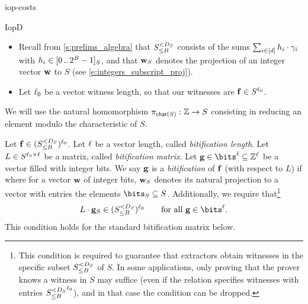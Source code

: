 \begin{lncsappendix}{iop-costs}
\begin{lncsmove}{IopD}
\begin{itemize}[leftmargin=*]
Let $D_S\geq 1$ be a degree bound, let $1,\eta_1,\ldots,\eta_{k_S}$ be a generating set of $S$ (\cref{s:prelims_algebra}), and let $\gamma_1, \gamma_2,\ldots, \gamma_\moduledegree\in S$ be the distinct elements of the form   with $a_1,\ldots,a_{k_S}\geq 0$ and $a_1+\cdots+a_{k_S}< D_S$, i.e.\ the monomials of total degree less than $D_S$ in the generators, so that $\moduledegree$ is the number of such monomials. Concretely $\moduledegree\leq \binom{D_S-1+k_S}{k_S}$.
\iflncs\else\item\fi{}  

Recall from \cref{s:prelims_algebra} that ${S_{\leq B}^{<D_S}}$ consists of the sums $\sum_{i\in [d]} h_i\cdot \gamma_i$ with $h_i \in [0 \, .. \, 2^B-1]_S$, and that $\mathbf{w}_S$ denotes the projection of an integer vector $\mathbf{w}$ to $S$ (see \eqref{e:integers_subscript_proj}).
     \iflncs\else\item\fi{} Let $\ell_0$ be a vector witness length, so that our witnesses are $\mathbf{f}\in S^{\ell_0}$.    
     \iflncs\else\end{itemize}\fi

     We will use the natural homomorphism $\pi_{\mathsf{char}(S)} : \mathbb{Z} \to S$ consisting in reducing an element modulo the characteristic of $S$. 

\begin{definition}\label{d:bitification}
Let $\mathbf{f} \in ({S_{\leq B}^{<D_S}})^{\ell_0}$. Let $\ell$ be a  vector length, called \emph{bitification  length}. Let $L\in S^{\ell_0 \times \ell}$ be a matrix, called  \emph{bitification matrix}. Let $\bfg\in \bits^\codedim\subseteq \ZZ^\codedim$ be a vector filled with integer bits. We say $\mathbf{g}$ is a
\emph{bitification} of $\mathbf{f}$ (with respect to $L$)  if
%
%
where for a vector $\mathbf{w}$ of integer bits, $\mathbf{w}_S$ denotes its natural projection to a vector with entries the elements $\bits_S \subseteq S$. 
%
Additionally, we require that\iflncs\else\footnote{This condition is required to guarantee that extractors obtain witnesses in  the specific subset ${S_{\leq B}^{<D_S}}$ of $S$. In some applications, only proving that the prover knows a witness in $S$ may suffice (even if the relation specifies witnesses with entries  ${S_{\leq B}^{<D_S}}^{\ell_0}$), and in that case the condition can be dropped.}\fi $$L\cdot \bfg_S\in (\moduleonebound)^{\codedim_0} \qquad \text{for all } \bfg\in \bits^{\codedim}.$$  This  condition holds for the standard bitification matrix below. 



\end{definition}
\end{lncsmove}
\end{lncsappendix}
